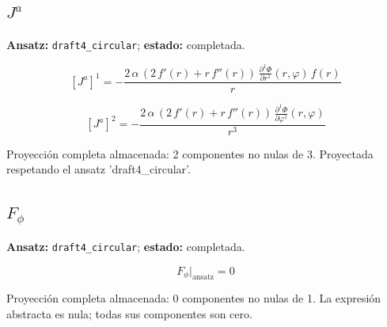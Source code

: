 \documentclass[11pt]{article}
\begin{document}
\subsection*{$ J^a $}
\textbf{Ansatz:} \texttt{draft4\_circular}; \textbf{estado:} completada.\par
\begin{dmath*}[breakdepth={5}]
\left[J^a\right]^{1} = -\frac{2\,\alpha\,\left(2\,f'\!\left(r\right) + r\,f''\!\left(r\right)\right)\,\frac{\partial^{1} \Phi}{\partial r^{1}}\!\left(r, \varphi\right)\,f\!\left(r\right)}{r}
\end{dmath*}
\par\smallskip
\begin{dmath*}[breakdepth={5}]
\left[J^a\right]^{2} = -\frac{2\,\alpha\,\left(2\,f'\!\left(r\right) + r\,f''\!\left(r\right)\right)\,\frac{\partial^{1} \Phi}{\partial \varphi^{1}}\!\left(r, \varphi\right)}{{r}^{3}}
\end{dmath*}
\par\smallskip
Proyección completa almacenada: 2 componentes no nulas de 3. Proyectada respetando el ansatz 'draft4\_circular'.\par\medskip
{}
\subsection*{$ F_{\phi} $}
\textbf{Ansatz:} \texttt{draft4\_circular}; \textbf{estado:} completada.\par
\begin{dmath*}[breakdepth={5}]
F_{\phi}\big|_{\mathrm{ansatz}} = 0
\end{dmath*}
\par\smallskip
Proyección completa almacenada: 0 componentes no nulas de 1. La expresión abstracta es nula; todas sus componentes son cero.\par\medskip
{}
\end{document}
